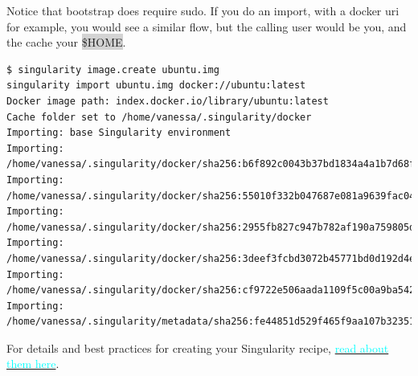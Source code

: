 \documentclass[a4paper]{article}
\begin{document}
Notice that bootstrap does require sudo. If you do an import, with a docker uri for example, you would see a similar flow, but the calling user would be you, and the cache your \colorbox{lightgray}{\$HOME}.
\begin{lstlisting}[frame=single]
$ singularity image.create ubuntu.img
singularity import ubuntu.img docker://ubuntu:latest
Docker image path: index.docker.io/library/ubuntu:latest
Cache folder set to /home/vanessa/.singularity/docker
Importing: base Singularity environment
Importing: /home/vanessa/.singularity/docker/sha256:b6f892c0043b37bd1834a4a1b7d68fe6421c6acbc7e7e63a4527e1d379f92c1b.tar.gz
Importing: /home/vanessa/.singularity/docker/sha256:55010f332b047687e081a9639fac04918552c144bc2da4edb3422ce8efcc1fb1.tar.gz
Importing: /home/vanessa/.singularity/docker/sha256:2955fb827c947b782af190a759805d229cfebc75978dba2d01b4a59e6a333845.tar.gz
Importing: /home/vanessa/.singularity/docker/sha256:3deef3fcbd3072b45771bd0d192d4e5ff2b7310b99ea92bce062e01097953505.tar.gz
Importing: /home/vanessa/.singularity/docker/sha256:cf9722e506aada1109f5c00a9ba542a81c9e109606c01c81f5991b1f93de7b66.tar.gz
Importing: /home/vanessa/.singularity/metadata/sha256:fe44851d529f465f9aa107b32351c8a0a722fc0619a2a7c22b058084fac068a4.tar.gz
\end{lstlisting}

For details and best practices for creating your Singularity recipe, \hyperref[sec:recipefile]{{\textcolor{cyan}{read about them here}}}.
\end{document}
